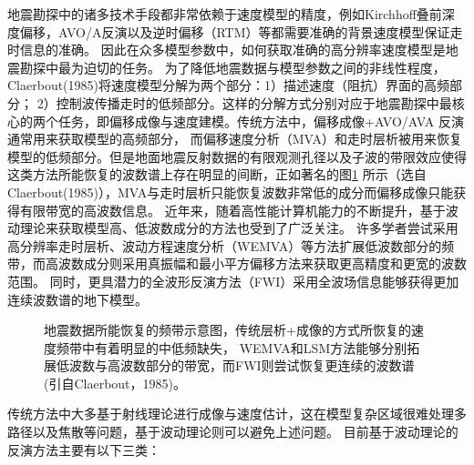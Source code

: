 地震勘探中的诸多技术手段都非常依赖于速度模型的精度，例如Kirchhoff叠前深度偏移，AVO/A反演以及逆时偏移（RTM）等都需要准确的背景速度模型保证走时信息的准确。
因此在众多模型参数中，如何获取准确的高分辨率速度模型是地震勘探中最为迫切的任务。
为了降低地震数据与模型参数之间的非线性程度，Claerbout(1985)\cite{Claerbout1985Imaging}将速度模型分解为两个部分：1）描述速度（阻抗）界面的高频部分；
2）控制波传播走时的低频部分。这样的分解方式分别对应于地震勘探中最核心的两个任务，即偏移成像与速度建模。传统方法中，偏移成像+AVO/AVA
反演通常用来获取模型的高频部分，
而偏移速度分析（MVA）和走时层析被用来恢复模型的低频部分。但是地面地震反射数据的有限观测孔径以及子波的带限效应使得
这类方法所能恢复的波数谱上存在明显的间断，正如著名的图\ref{fig:GapInSeisVel}
所示（选自Claerbout(1985)\cite{Claerbout1985Imaging}），MVA与走时层析只能恢复波数非常低的成分而偏移成像只能获得有限带宽的高波数信息。
近年来，随着高性能计算机能力的不断提升，基于波动理论来获取模型高、低波数成分的方法也受到了广泛关注。
许多学者尝试采用高分辨率走时层析、波动方程速度分析（WEMVA）等方法扩展低波数部分的频带，而高波数成分则采用真振幅和最小平方偏移方法来获取更高精度和更宽的波数范围。
同时，更具潜力的全波形反演方法（FWI）采用全波场信息能够获得更加连续波数谱的地下模型。
\begin{figure}[!htb] 
   \centering 
   \caption{地震数据所能恢复的频带示意图，传统层析+成像的方式所恢复的速度频带中有着明显的中低频缺失，
	   WEMVA和LSM方法能够分别拓展低波数与高波数部分的带宽，而FWI则尝试恢复更连续的波数谱(引自Claerbout，1985\cite{Claerbout1985Imaging})。}
   \label{fig:GapInSeisVel}
\end{figure}

传统方法中大多基于射线理论进行成像与速度估计，这在模型复杂区域很难处理多路径以及焦散等问题，基于波动理论则可以避免上述问题。
目前基于波动理论的反演方法主要有以下三类：

